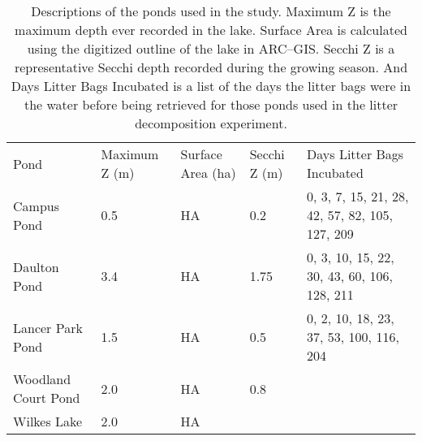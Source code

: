 \begin{table}
\label{tab:ponds}
\begin{tabular}{l l l l l}
Pond & Maximum Z (m) & Surface Area (ha) & Secchi Z (m) & Days Litter Bags Incubated \\
Campus Pond & 0.5 & HA & 0.2 & 0, 3, 7, 15, 21, 28, 42, 57, 82, 105, 127, 209\\
Daulton Pond & 3.4 & HA & 1.75 & 0, 3, 10, 15, 22, 30, 43, 60, 106, 128, 211\\
Lancer Park Pond & 1.5 & HA & 0.5 & 0, 2, 10, 18, 23, 37, 53, 100, 116, 204\\
Woodland Court Pond & 2.0 & HA & 0.8 & \\
Wilkes Lake & 2.0 & HA & \\
\end{tabular}
\caption{Descriptions of the ponds used in the study. Maximum Z is the maximum depth ever recorded in the lake. Surface Area is calculated using the digitized outline of the lake in ARC--GIS. Secchi Z is a representative Secchi depth recorded during the growing season. And Days Litter Bags Incubated is a list of the days the litter bags were in the water before being retrieved for those ponds used in the litter decomposition experiment.}
\end{table}